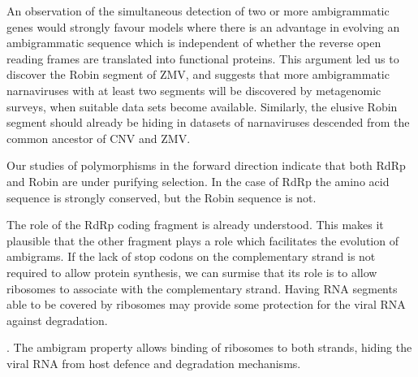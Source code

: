 \documentclass[unnumsec,webpdf,contemporary,large,namedate]{oup-authoring-template}%
\theoremstyle{thmstyleone}%
\theoremstyle{thmstyletwo}%
\theoremstyle{thmstylethree}%
\begin{document}
An observation of the simultaneous detection of two or more ambigrammatic genes would
strongly favour models where there is an advantage in evolving an
ambigrammatic sequence which is independent of whether the reverse open reading
frames are translated into functional proteins. This argument led us to discover the Robin segment
of ZMV, and suggests that more ambigrammatic narnaviruses with at least two segments will be discovered
by metagenomic surveys, when suitable data sets become available.
Similarly, the elusive Robin segment should already be hiding in datasets of narnaviruses descended from the common ancestor of CNV and ZMV.


Our studies of polymorphisms in the forward direction indicate that both RdRp and Robin are under purifying selection.
In the case of RdRp the amino acid sequence is strongly conserved,
but the Robin sequence is not.

The role of the RdRp coding fragment
is already understood. This makes it plausible that the other fragment plays a role which facilitates the
evolution of ambigrams. If the lack of stop codons on the complementary strand is not required
to allow protein synthesis, we can surmise that its role is to allow ribosomes to associate with the
complementary strand. Having RNA segments able to be covered by ribosomes may provide some protection
for the viral RNA against degradation.

. The ambigram property allows binding of ribosomes to both strands, hiding the viral 
RNA from host defence and degradation mechanisms. 
\end{document}
